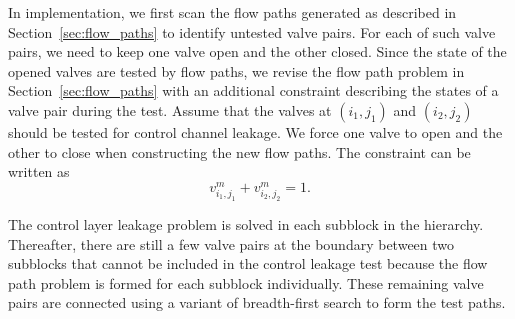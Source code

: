 In implementation, we first scan the flow paths generated as described in 
Section~\ref{sec:flow_paths}
to identify untested valve pairs. For each of such
valve pairs, we need to keep one valve open and the other closed. Since the
state of the opened valves are tested by flow paths, 
we revise the flow path problem in Section~\ref{sec:flow_paths} with an
additional constraint describing the states of a valve pair during the test.
Assume that the valves at $(i_1,j_1)$ and $(i_2,j_2)$ should be tested for
control channel leakage. We force one valve to open and the other to close
when constructing the new flow paths. The constraint can be written as
\begin{equation}
v^m_{i_1,j_1}+v^m_{i_2,j_2}=1. 
\end{equation}

The control layer leakage problem is solved in each subblock in the
hierarchy. Thereafter, there are still a few valve pairs at the boundary
between two subblocks that cannot be included in the control leakage test
because the flow path problem is formed for each subblock individually. These
remaining valve pairs are connected using a variant of breadth-first search to form the
test paths.
